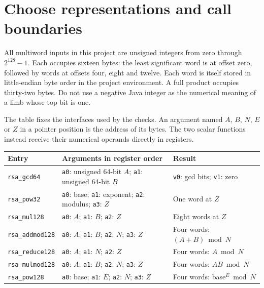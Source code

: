 \section{Choose representations and call boundaries}
All multiword inputs in this project are unsigned integers from zero through
\(2^{128}-1\). Each occupies sixteen bytes: the least significant word is at offset
zero, followed by words at offsets four, eight and twelve. Each word is itself stored
in little-endian byte order in the project environment. A full product occupies
thirty-two bytes. Do not use a negative Java integer as the numerical meaning of a
limb whose top bit is one.

The table fixes the interfaces used by the checks. An argument named \(A\), \(B\),
\(N\), \(E\) or \(Z\) in a pointer position is the address of its bytes. The two
scalar functions instead receive their numerical operands directly in registers.
\begin{longtable}{p{}p{}p{}}
  Entry                   & Arguments in register order                                                        & Result                                   \\
  \hline
  \texttt{rsa\_gcd64}     & \texttt{a0}: unsigned 64-bit \(A\); \texttt{a1}: unsigned 64-bit \(B\)             & \texttt{v0}: gcd bits; \texttt{v1}: zero \\
  \texttt{rsa\_pow32}     & \texttt{a0}: base; \texttt{a1}: exponent; \texttt{a2}: modulus; \texttt{a3}: \(Z\) & One word at \(Z\)                        \\
  \texttt{rsa\_mul128}    & \texttt{a0}: \(A\); \texttt{a1}: \(B\); \texttt{a2}: \(Z\)                         & Eight words at \(Z\)                     \\
  \texttt{rsa\_addmod128} & \texttt{a0}: \(A\); \texttt{a1}: \(B\); \texttt{a2}: \(N\); \texttt{a3}: \(Z\)     & Four words: \((A+B)\bmod N\)             \\
  \texttt{rsa\_reduce128} & \texttt{a0}: \(A\); \texttt{a1}: \(N\); \texttt{a2}: \(Z\)                         & Four words: \(A\bmod N\)                 \\
  \texttt{rsa\_mulmod128} & \texttt{a0}: \(A\); \texttt{a1}: \(B\); \texttt{a2}: \(N\); \texttt{a3}: \(Z\)     & Four words: \(AB\bmod N\)                \\
  \texttt{rsa\_pow128}    & \texttt{a0}: base; \texttt{a1}: \(E\); \texttt{a2}: \(N\); \texttt{a3}: \(Z\)      & Four words: base\(^{E}\bmod N\)          \\
\end{longtable}

